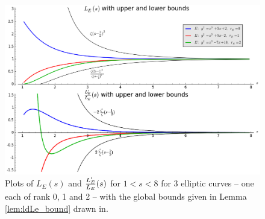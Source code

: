 \begin{figure}[!h]
    \centering
    \includegraphics[width=1.0\textwidth]{graphics/L_E_and_logderiv_bounds.png}
    \caption{Plots of $L_E(s)$ and $\frac{L_E^{\prime}}{L_E}(s)$ for $1<s<8$ for 3 elliptic curves -- one each of rank 0, 1 and 2 -- with the global bounds given in Lemma \ref{lem:ldLe_bound} drawn in.}
    \label{fig:L_E_and_logderiv_bounds}
\end{figure}

